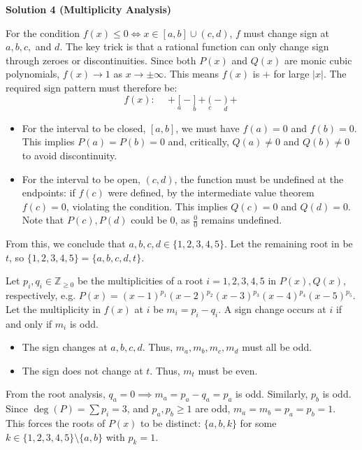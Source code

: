 \begin{enumerate}
 



\textbf{Solution 4 (Multiplicity Analysis)}

For the condition $f(x)\le 0 \iff x\in [a,b]\cup(c,d)$, $f$ must change sign at $a, b, c,$ and $d$. The key trick is that a rational function can only change sign through zeroes or discontinuities. Since both $P(x)$ and $Q(x)$ are monic cubic polynomials, $f(x) \to 1$ as $x \to \pm\infty$. This means $f(x)$ is $+$ for large $|x|$. The required sign pattern must therefore be:
 \[f(x): \quad +\underset{ a }{ [ }-\underset{ b }{ ] }+\underset{ c }{ ( }-\underset{ d }{ ) }+\]

            \begin{itemize}
        \item For the interval to be closed, $[a, b]$, we must have $f(a) = 0$ and $f(b) = 0$. This implies $P(a) = P(b) = 0$ and, critically, $Q(a) \neq 0$ and $Q(b) \neq 0$ to avoid discontinuity.
        \item For the interval to be open, $(c, d)$, the function must be undefined at the endpoints: if $f(c)$ were defined, by the intermediate value theorem $f(c)=0$, violating the condition. This implies $Q(c) = 0$ and $Q(d) = 0$. Note that $P(c),P(d)$ could be $0$, as $\frac{0}{0}$ remains undefined.
            \end{itemize}
            From this, we conclude that $a, b, c, d\in \{ 1,2,3,4,5 \}$. Let the remaining root in be $t$, so $\{ 1,2,3,4,5 \}=\{ a,b,c,d,t \}$.

 Let $p_i, q_i\in \mathbb{Z}_{\ge 0}$ be the multiplicities of a root $i=1,2,3,4,5$ in $P(x),Q(x)$, respectively, e.g. $P(x)=(x-1)^{p_{1}}(x-2)^{p_{2}}(x-3)^{p_{3}}(x-4)^{p_{4}}(x-5)^{p_{5}}$. Let the multiplicity in $f(x)$ at $i$ be $m_i = p_i - q_i$. A sign change occurs at $i$ if and only if $m_i$ is odd.

 
            \begin{itemize}
        \item The sign changes at $a, b, c, d$. Thus, $m_a, m_b, m_c, m_d$ must all be odd.
        \item The sign does not change at $t$. Thus, $m_t$ must be even.
            \end{itemize}
            From the root analysis, $q_a = 0 \implies m_a=p_{a}-q_{a} = p_a$ is odd. Similarly, $p_b$ is odd. Since $\deg(P) = \sum p_i = 3$, and $p_a, p_b\ge 1$ are odd, $m_{a}=m_{b}=p_{a}=p_{b}=1$. This forces the roots of $P(x)$ to be distinct: $\{a, b, k\}$ for some $k \in \{ 1,2,3,4,5 \} \setminus \{a, b\}$ with $p_{k}=1$.


\end{enumerate}
